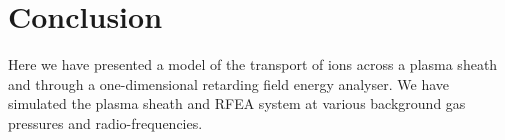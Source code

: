 \section{\label{Conclusion}Conclusion}

Here we have presented a model of the transport of ions across a plasma sheath and through a one-dimensional retarding field energy analyser. We have simulated the plasma sheath and RFEA system at various background gas pressures and radio-frequencies. 
